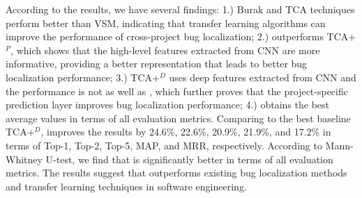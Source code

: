 According to the results, we have several findings: 1.) Burak and TCA techniques perform better than VSM, indicating that transfer learning algorithms can improve the performance of cross-project bug localization; 2.) \TRANPCNN outperforms TCA+$^P$, which shows that the high-level features extracted from CNN are more informative, providing a better representation that leads to better bug localization performance; 3.) TCA+$^D$ uses deep features extracted from CNN and the performance is not as well as \TRANPCNN, which further proves that the project-specific prediction layer improves bug localization performance; 4.) \TRANPCNN obtains the best average values in terms of all evaluation metrics. Comparing to the best baseline TCA+$^{D}$, \TRANPCNN improves the results by 24.6\%, 22.6\%, 20.9\%, 21.9\%, and 17.2\% in terms of Top-1, Top-2, Top-5, MAP, and MRR, respectively. According to Mann-Whitney U-test, we find that \TRANPCNN is significantly better in terms of all evaluation metrics. The results suggest that \TRANPCNN outperforms existing bug localization methods and transfer learning techniques in software engineering.


